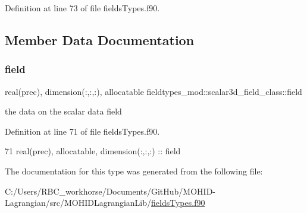 Definition at line 73 of file fields\+Types.\+f90.



\subsection{Member Data Documentation}
\mbox{\label{structfieldtypes__mod_1_1scalar3d__field__class_a1fc76fc336c07c0189299ae64fee564f}} 
\subsubsection{\texorpdfstring{field}{field}}
{\footnotesize\ttfamily real(prec), dimension(\+:,\+:,\+:), allocatable fieldtypes\+\_\+mod\+::scalar3d\+\_\+field\+\_\+class\+::field\hspace{0.3cm}{\ttfamily [private]}}



the data on the scalar data field 



Definition at line 71 of file fields\+Types.\+f90.


\begin{DoxyCode}
71         \textcolor{keywordtype}{real(prec)}, \textcolor{keywordtype}{allocatable}, \textcolor{keywordtype}{dimension(:,:,:)} :: field
\end{DoxyCode}


The documentation for this type was generated from the following file\+:\begin{DoxyCompactItemize}
\item 
C\+:/\+Users/\+R\+B\+C\+\_\+workhorse/\+Documents/\+Git\+Hub/\+M\+O\+H\+I\+D-\/\+Lagrangian/src/\+M\+O\+H\+I\+D\+Lagrangian\+Lib/\mbox{\hyperlink{fields_types_8f90}{fields\+Types.\+f90}}\end{DoxyCompactItemize}
